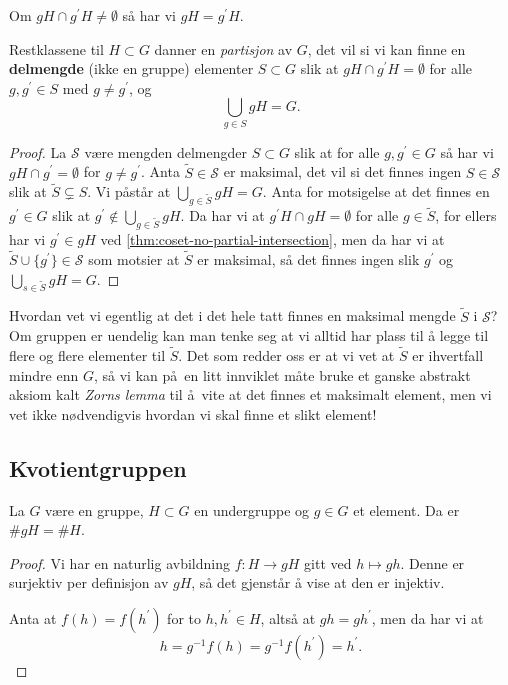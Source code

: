 \begin{corollary}\label{thm:coset-no-partial-intersection}
    Om $gH\cap g^\prime H\neq \emptyset$ så har vi $gH = g^\prime H$.
\end{corollary}

\begin{corollary}
    Restklassene til $H\subset G$ danner en \textit{partisjon} av $G$,
    det vil si vi kan finne en \textbf{delmengde} (ikke en gruppe) elementer
    $S\subset G$ slik at $gH \cap g^\prime H = \emptyset$ for alle $g,g^\prime\in S$
    med $g\neq g^\prime$, og
    \[
        \bigcup_{g\in S} gH = G.
    \]
\end{corollary}
\begin{proof}
    La $\mathscr S$ være mengden delmengder $S\subset G$ slik at
    for alle $g,g^\prime \in G$ så har vi $gH\cap g^\prime = \emptyset$
    for $g\neq g^\prime$.
    Anta $\tilde S\in \mathscr S$ er maksimal, det vil si det finnes ingen
    $S\in \mathscr S$ slik at $\tilde S\subsetneq S$.
    Vi påstår at $\bigcup_{g\in \tilde S} gH = G$.
    Anta for motsigelse at det finnes en $g^\prime\in G$ slik at
    $g^\prime\notin \bigcup_{g\in \tilde S} gH$.
    Da har vi at $g^\prime H\cap gH = \emptyset$ for alle $g\in \tilde S$,
    for ellers har vi $g^\prime \in gH$ ved \cref{thm:coset-no-partial-intersection},
    men da har vi at $\tilde S\cup \{g^\prime\}\in\mathscr S$
    som motsier at $\tilde S$ er maksimal,
    så det finnes ingen slik $g^\prime$ og $\bigcup_{s\in\tilde S} gH = G$.
\end{proof}

\begin{remark}
    Hvordan vet vi egentlig at det i det hele tatt finnes en maksimal
    mengde $\tilde S$ i $\mathscr S$?
    Om gruppen er uendelig kan man tenke seg at vi alltid
    har plass til å legge til flere og flere elementer til $\tilde S$.
    Det som redder oss er at vi vet at $\tilde S$ er ihvertfall mindre enn $G$,
    så vi kan på en litt innviklet måte bruke et ganske abstrakt aksiom
    kalt \textit{Zorns lemma} til å vite at det finnes et maksimalt element,
    men vi vet ikke nødvendigvis hvordan vi skal finne et slikt element!
\end{remark}

\subsection{Kvotientgruppen}

\begin{lemma}
    La $G$ være en gruppe, $H\subset G$ en undergruppe
    og $g\in G$ et element.
    Da er $\# gH = \# H$.
\end{lemma}
\begin{proof}
    Vi har en naturlig avbildning $f\colon H\to gH$ gitt ved $h\mapsto gh$.
    Denne er surjektiv per definisjon av $gH$, så det gjenstår å vise at den er
    injektiv.

    Anta at $f(h) = f(h^\prime)$ for to $h, h^\prime \in H$,
    altså at $gh = gh^\prime$, men da har vi at
    \[
        h
        = g^{-1} f(h)
        = g^{-1} f(h^\prime)
        = h^\prime.
    \]
\end{proof}

